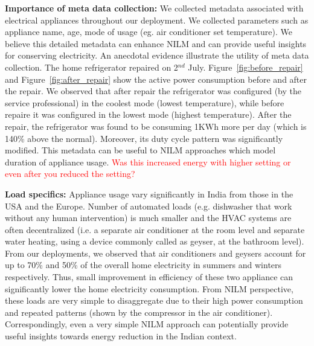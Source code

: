 \documentclass[10pt]{sensys-proc}
\newcommand{\redcolor}[1]{\textcolor{red}{#1}}
\newcommand{\figref}[1]{Figure~\ref{#1}}
\begin{document}
\noindent \textbf{Importance of meta data collection:} We collected metadata associated with electrical appliances throughout our deployment. We collected parameters such as appliance name, age, mode of usage (eg. air conditioner set temperature). We believe this detailed metadata can enhance NILM and can provide useful insights for conserving electricity. An anecdotal evidence illustrate the utility of meta data collection. The home refrigerator repaired on 2$^{nd}$ July. \figref{fig:before_repair} and \figref{fig:after_repair} show the active power consumption before and after the repair. We observed that after repair the refrigerator was configured (by the service professional) in the coolest mode (lowest temperature), while before repaire it was configured in the lowest mode (highest temperature). After the repair, the refrigerator was found to be consuming 1KWh more per day (which is 140\% above the normal). Moreover, its duty cycle pattern was significantly modified. This metadata can be useful to NILM approaches which model duration of appliance usage. \redcolor{Was this increased energy with higher setting or even after you reduced the setting?}

\noindent \textbf{Load specifics:} Appliance usage vary significantly in India from those in the USA and the Europe. Number of automated loads (e.g. dishwasher that work without any human intervention) is much smaller and the HVAC systems are often decentralized (i.e. a separate air conditioner at the room level and separate water heating, using a device commonly called as geyser, at the bathroom level). From our deployments, we observed that air conditioners and geysers account for up to 70\% and 50\% of the overall home electricity in summers and winters respectively. Thus, small improvement in efficiency of these two appliance can significantly lower the home electricity consumption. From NILM perspective, these loads are very simple to disaggregate due to their high power consumption and repeated patterns (shown by the compressor in the air conditioner). Correspondingly, even a very simple NILM approach can potentially provide useful insights towards energy reduction in the Indian context.
\end{document}
